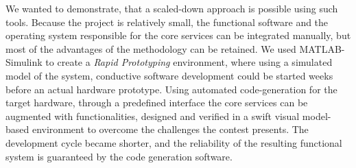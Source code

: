 
We wanted to demonstrate, that a scaled-down approach is possible using such tools. Because the project is relatively small, the functional software and the operating system responsible for the core services can be integrated manually, but most of the advantages of the methodology can be retained. We used MATLAB-Simulink to create a \emph{Rapid Prototyping} environment, where using a simulated model of the system, conductive software development could be started weeks before an actual hardware prototype. Using automated code-generation for the target hardware, through a predefined interface the core services can be augmented with functionalities, designed and verified in a swift visual model-based environment to overcome the challenges the contest presents. The development cycle became shorter, and the reliability of the resulting functional system is guaranteed by the code generation software.